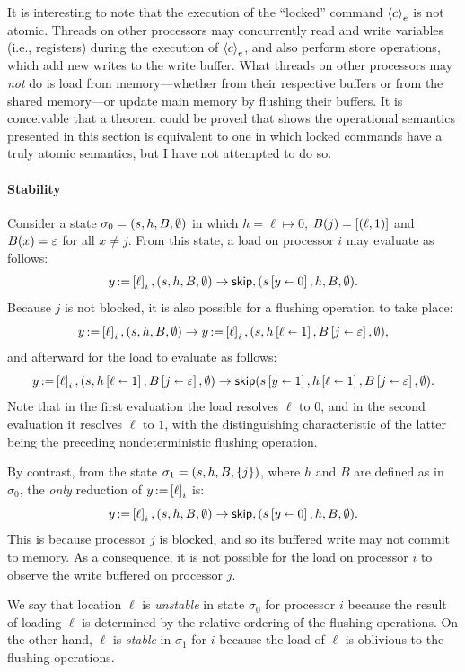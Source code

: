 \documentclass[11pt]{report}
\begin{document}
It is interesting to note that the execution of the ``locked'' command $\cwith{e}{c}$ is not atomic. Threads on other processors may concurrently read and write variables (i.e., registers) during the execution of $\cwith{e}{c}$, and also perform store operations, which add new writes to the write buffer. What threads on other processors may \emph{not} do is load from memory---whether from their respective buffers or from the shared memory---or update main memory by flushing their buffers. It is conceivable that a theorem could be proved that shows the operational semantics presented in this section is equivalent to one in which locked commands have a truly atomic semantics, but I have not attempted to do so. 

\paragraph{Stability} Consider a state $\sigma_0 = (s,h,B,\nil)$ in which $h = \ell \mapsto 0$, $B(j) = \llit{(\ell,1)}$ and $B(x) = \lnil$ for all $x \neq j$. From this state, a load on processor $i$ may evaluate as follows: \[ \cload{y}{\ell}_i,(s,h,B,\nil) \step \cskip,(\funup{s}{\ptup{y}{0}},h,B,\nil).\] Because $j$ is not blocked, it is also possible for a flushing operation to take place: \[ \cload{y}{\ell}_i,(s,h,B,\nil) \step \cload{y}{\ell}_i,(s,\funup{h}{\ptup{\ell}{1}},\funup{B}{\ptup{j}{\lnil}},\nil),\] and afterward for the load to evaluate as follows: \[ \cload{y}{\ell}_i,(s,\funup{h}{\ptup{\ell}{1}},\funup{B}{\ptup{j}{\lnil}},\nil) \step \cskip(\funup{s}{\ptup{y}{1}},\funup{h}{\ptup{\ell}{1}},\funup{B}{\ptup{j}{\lnil}},\nil).\] Note that in the first evaluation the load resolves $\ell$ to $0$, and in the second evaluation it resolves $\ell$ to $1$, with the distinguishing characteristic of the latter being the preceding nondeterministic flushing operation. 

By contrast, from the state $\sigma_1 = (s,h,B,\set{j})$, where $h$ and $B$ are defined as in $\sigma_0$, the \emph{only} reduction of $\cload{y}{\ell}_i$ is: \[ \cload{y}{\ell}_i,(s,h,B,\nil) \step \cskip,(\funup{s}{\ptup{y}{0}},h,B,\nil).\] This is because processor $j$ is blocked, and so its buffered write may not commit to memory. As a consequence, it is not possible for the load on processor $i$ to observe the write buffered on processor $j$. 

We say that location $\ell$ is \emph{unstable} in state $\sigma_0$ for processor $i$ because the result of loading $\ell$ is determined by the relative ordering of the flushing operations. On the other hand, $\ell$ is \emph{stable} in $\sigma_1$ for $i$ because the load of $\ell$ is oblivious to the flushing operations. 
\end{document}
